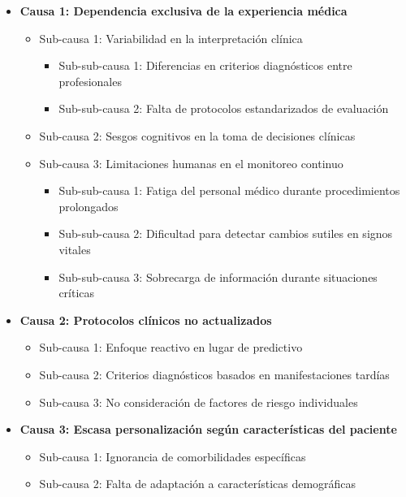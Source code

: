 \begin{itemize}
    \item \textbf{Causa 1: Dependencia exclusiva de la experiencia médica}
    \begin{itemize}
        \item Sub-causa 1: Variabilidad en la interpretación clínica
        \begin{itemize}
            \item Sub-sub-causa 1: Diferencias en criterios diagnósticos entre profesionales
            \item Sub-sub-causa 2: Falta de protocolos estandarizados de evaluación
        \end{itemize}
        \item Sub-causa 2: Sesgos cognitivos en la toma de decisiones clínicas
        \item Sub-causa 3: Limitaciones humanas en el monitoreo continuo
        \begin{itemize}
            \item Sub-sub-causa 1: Fatiga del personal médico durante procedimientos prolongados
            \item Sub-sub-causa 2: Dificultad para detectar cambios sutiles en signos vitales
            \item Sub-sub-causa 3: Sobrecarga de información durante situaciones críticas
        \end{itemize}
    \end{itemize}
    
    \item \textbf{Causa 2: Protocolos clínicos no actualizados}
    \begin{itemize}
        \item Sub-causa 1: Enfoque reactivo en lugar de predictivo
        \item Sub-causa 2: Criterios diagnósticos basados en manifestaciones tardías
        \item Sub-causa 3: No consideración de factores de riesgo individuales
    \end{itemize}
    
    \item \textbf{Causa 3: Escasa personalización según características del paciente}
    \begin{itemize}
        \item Sub-causa 1: Ignorancia de comorbilidades específicas
        \item Sub-causa 2: Falta de adaptación a características demográficas
    \end{itemize}
\end{itemize}

